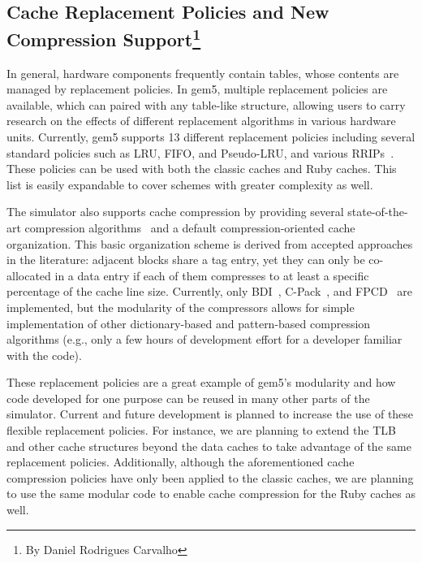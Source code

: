 \subsection[Cache Replacement Policies and New Compression Support]{Cache Replacement Policies and New Compression Support\footnote{By Daniel Rodrigues Carvalho}}

In general, hardware components frequently contain tables, whose contents are managed by replacement policies.
In gem5, multiple replacement policies are available, which can paired with any table-like structure, allowing users to carry research on the effects of different replacement algorithms in various hardware units.
Currently, gem5 supports 13 different replacement policies including several standard policies such as LRU, FIFO, and Pseudo-LRU, and various RRIPs~\cite{Jaleel2010rrip}.
These policies can be used with both the classic caches and Ruby caches.
This list is easily expandable to cover schemes with greater complexity as well.

The simulator also supports cache compression by providing several state-of-the-art compression algorithms~\cite{sardashti2015primer} and a default compression-oriented cache organization.
This basic organization scheme is derived from accepted approaches in the literature: adjacent blocks share a tag entry, yet they can only be co-allocated in a data entry if each of them compresses to at least a specific percentage of the cache line size.
Currently, only BDI~\cite{pekhimenko2012base}, C-Pack~\cite{chen2010c}, and FPCD~\cite{alameldeen2018opportunistic} are implemented, but the modularity of the compressors allows for simple implementation of other dictionary-based and pattern-based compression algorithms (e.g., only a few hours of development effort for a developer familiar with the code).

These replacement policies are a great example of gem5's modularity and how code developed for one purpose can be reused in many other parts of the simulator.
Current and future development is planned to increase the use of these flexible replacement policies.
For instance, we are planning to extend the TLB and other cache structures beyond the data caches to take advantage of the same replacement policies.
Additionally, although the aforementioned cache compression policies have only been applied to the classic caches, we are planning to use the same modular code to enable cache compression for the Ruby caches as well.
